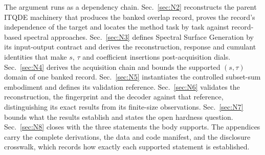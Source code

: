 The argument runs as a dependency chain. Sec.~\ref{sec:N2} reconstructs the parent ITQDE machinery that produces the banked overlap record, proves the record's independence of the target and locates the method task by task against record-based spectral approaches. Sec.~\ref{sec:N3} defines Spectral Surface Generation by its input-output contract and derives the reconstruction, response and cumulant identities that make $s$, $\tau$ and coefficient insertions post-acquisition dials. Sec.~\ref{sec:N4} derives the acquisition chain and bounds the supported $(s, \tau)$ domain of one banked record. Sec.~\ref{sec:N5} instantiates the controlled subset-sum embodiment and defines its validation reference. Sec.~\ref{sec:N6} validates the reconstruction, the fingerprint and the decoder against that reference, distinguishing its exact results from its finite-size observations. Sec.~\ref{sec:N7} bounds what the results establish and states the open hardness question. Sec.~\ref{sec:N8} closes with the three statements the body supports. The appendices carry the complete derivations, the data and code manifest, and the disclosure crosswalk, which records how exactly each supported statement is established.
